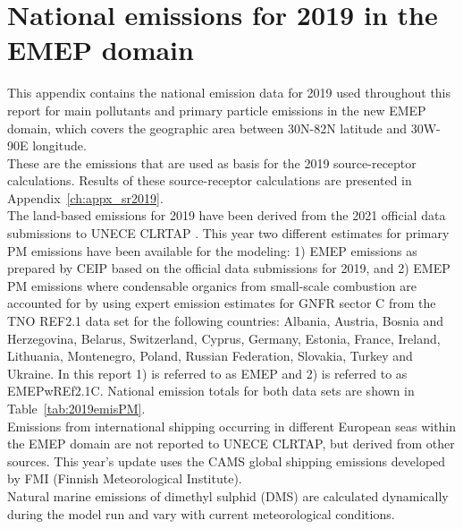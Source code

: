 \setcounter{page}{1}

\cleardoublepage
\chapter[2019 Emissions]{National emissions for 2019 in the EMEP domain}
\label{ch:appx_emis_2019}


This appendix contains the national emission data for 2019 used throughout this
report for main pollutants and  primary particle emissions in the new 
EMEP domain, which covers the geographic area between 30\degrees N-82\degrees N latitude and 30\degrees W-90\degrees E longitude. \\

These are the emissions that are used as basis
 for the 2019 source-receptor calculations. Results of these
 source-receptor calculations are presented in Appendix~\ref{ch:appx_sr2019}.\\

The land-based emissions for 2019 have been derived from the 2021
official data submissions to UNECE CLRTAP  \citep{CEIP2021}.
This year two different estimates for primary PM emissions have been available for the modeling: 1) EMEP emissions as prepared by CEIP based on the official data submissions for 2019, and 2) EMEP PM emissions where condensable organics from small-scale combustion are accounted for by using expert emission estimates for GNFR sector C from the TNO REF2.1 data set for the following countries: Albania, Austria, Bosnia and Herzegovina, Belarus, Switzerland, Cyprus, Germany, Estonia, France,  Ireland, Lithuania, Montenegro, Poland, Russian Federation, Slovakia, Turkey and Ukraine.
In this report 1) is referred to as EMEP and 2) is referred to as EMEPwREf2.1C. National emission totals for both data sets are shown in Table~\ref{tab:2019emisPM}.  \\

Emissions from international shipping occurring in different European seas within the EMEP domain are not reported to UNECE CLRTAP, but derived from other sources. This year's update uses the CAMS global shipping emissions \citep{CAMSemis2019}  developed by FMI (Finnish Meteorological Institute).
\\

Natural marine emissions of dimethyl sulphid (DMS) are calculated dynamically during the model run and vary with current meteorological conditions. 


